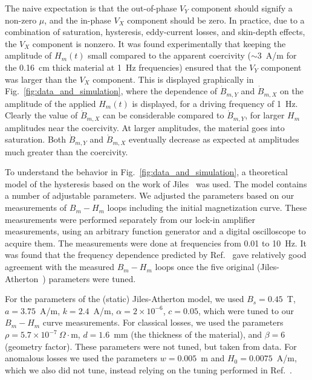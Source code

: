 The naive expectation is that the out-of-phase $V_Y$ component should
signify a non-zero $\mu$, and the in-phase $V_X$ component should be
zero.  In practice, due to a combination of saturation, hysteresis,
eddy-current losses, and skin-depth effects, the $V_X$ component is
nonzero.  It was found experimentally that keeping the amplitude of
$H_m(t)$ small compared to the apparent coercivity ($\sim 3$~A/m for
the 0.16~cm thick material at 1~Hz frequencies) ensured that the $V_Y$
component was larger than the $V_X$ component.  This is displayed
graphically in Fig.~\ref{fig:data_and_simulation}, where the
dependence of $\dot{B}_{m,Y}$ and $\dot{B}_{m,X}$ on the amplitude of
the applied $H_m(t)$ is displayed, for a driving frequency of 1~Hz.
Clearly the value of $\dot{B}_{m,X}$ can be considerable compared to
$\dot{B}_{m,Y}$, for larger $H_m$ amplitudes near the coercivity.  At
larger amplitudes, the material goes into saturation.  Both
$\dot{B}_{m,Y}$ and $\dot{B}_{m,X}$ eventually decrease as expected at
amplitudes much greater than the coercivity.

To understand the behavior in Fig.~\ref{fig:data_and_simulation}, a
theoretical model of the hysteresis based on the work of
Jiles~\cite{jiles1994frequency} was used.  The model contains a number of
adjustable parameters.  We adjusted the parameters based on our
measurements of $B_m-H_m$ loops including the initial magnetization
curve.  These measurements were performed separately from our lock-in
amplifier measurements, using an arbitrary function generator and a
digital oscilloscope to acquire them.  The measurements were done at
frequencies from 0.01 to 10~Hz.  It was found that the frequency
dependence predicted by Ref.~\cite{jiles1994frequency} gave relatively good
agreement with the measured $B_m-H_m$ loops once the five original
(Jiles-Atherton~\cite{jiles1984theory,jiles1986theory}) parameters were tuned.

For the parameters of the (static) Jiles-Atherton model, we used
$B_s=0.45$~T, $a=3.75$~A/m, $k=2.4$~A/m, $\alpha=2\times 10^{-6}$,
$c=0.05$, which were tuned to our $B_m-H_m$ curve measurements.  For
classical losses, we used the parameters $\rho=5.7\times
10^{-7}~\Omega\cdot$m, $d=1.6$~mm (the thickness of the material), and
$\beta=6$ (geometry factor).  These parameters were not tuned, but
taken from data.  For anomalous losses we used the parameters
$w=0.005$~m and $H_0=0.0075$~A/m, which we also did not tune, instead
relying on the tuning performed in Ref.~\cite{jiles1994frequency}.


